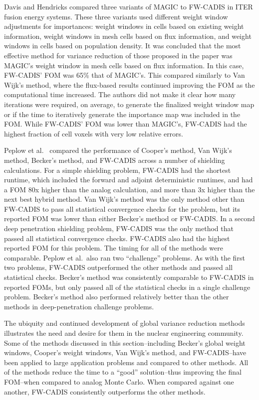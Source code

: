 Davis and Hendricks compared three variants of MAGIC
to FW-CADIS in ITER fusion energy systems.
These three variants used different weight window adjustments for importances:
weight windows in cells based on existing weight information, weight windows in
mesh cells based on flux information, and weight windows in cells based on
population density.
It was concluded that the most effective method for variance
reduction of those proposed in the paper
was MAGIC's weight window in mesh cells based on flux
information. In this case, FW-CADIS' FOM was 65\% that of MAGIC's. This compared
similarly to Van Wijk's method, where the flux-based results continued improving
the FOM as the computational time increased.
The authors did not make it clear how many iterations were required, on average,
to generate the finalized weight window map or if the time to iteratively
generate the importance map was included in the FOM.
While FW-CADIS' FOM was lower
than MAGIC's, FW-CADIS had the highest fraction of cell voxels with very low
relative errors.

Peplow et al.\ \cite{peplow_comparison_2012} compared the performance of
Cooper's method, Van Wijk's method, Becker's method, and FW-CADIS
across a number of shielding calculations. For a simple shielding
problem, FW-CADIS had the shortest runtime, which included the forward and
adjoint deterministic runtimes, and had a FOM 80x higher than the analog
calculation, and more than 3x higher than the next best hybrid method. Van Wijk's method was
the only method other than FW-CADIS to pass all statistical convergence checks
for the problem, but its reported FOM was lower than either Becker's method or
FW-CADIS. In a second deep penetration shielding problem, FW-CADIS was the
only method
that passed all statistical convergence checks. FW-CADIS also had the highest
reported FOM for this problem. The timing for all of the methods were
comparable. Peplow et al.\ also ran two ``challenge'' problems. As with the first
two problems, FW-CADIS outperformed the other methods and passed all statistical
checks. Becker's method was
consistently comparable to FW-CADIS in reported FOMs, but only passed all of the
statistical checks in a single challenge problem. Becker's method also performed
relatively better than the other methods in deep-penetration challenge problems.

The ubiquity and continued development of global variance reduction methods
illustrates the need and desire for them in the nuclear engineering community.
Some of the
methods discussed in this section--including Becker's global weight windows,
Cooper's weight windows, Van Wijk's method, and FW-CADIS--have
been applied to large application problems and compared to other methods.
All of the methods reduce the time to a ``good'' solution--thus improving the
final FOM--when
compared to analog Monte Carlo. When compared against one another, FW-CADIS
consistently outperforms the other methods.
